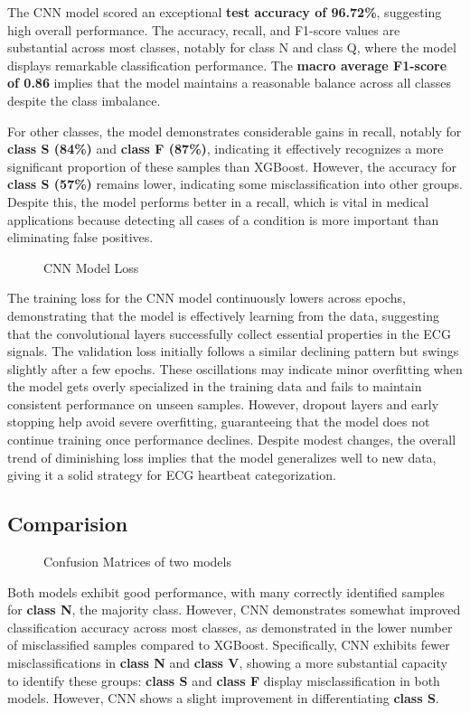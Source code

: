 \indent \indent The CNN model scored an exceptional \textbf{test accuracy of 96.72\%}, suggesting high overall performance. The accuracy, recall, and F1-score values are substantial across most classes, notably for class N and class Q, where the model displays remarkable classification performance. The \textbf{macro average F1-score of 0.86} implies that the model maintains a reasonable balance across all classes despite the class imbalance.

\indent For other classes, the model demonstrates considerable gains in recall, notably for \textbf{class S (84\%)} and \textbf{class F (87\%)}, indicating it effectively recognizes a more significant proportion of these samples than XGBoost. However, the accuracy for \textbf{class S (57\%)} remains lower, indicating some misclassification into other groups. Despite this, the model performs better in a recall, which is vital in medical applications because detecting all cases of a condition is more important than eliminating false positives.

\begin{figure}[H]
    \centering
        
    \caption{CNN Model Loss}
    \label{fig:CNNLoss}
\end{figure}

\indent The training loss for the CNN model continuously lowers across epochs, demonstrating that the model is effectively learning from the data, suggesting that the convolutional layers successfully collect essential properties in the ECG signals.  The validation loss initially follows a similar declining pattern but swings slightly after a few epochs.  These oscillations may indicate minor overfitting when the model gets overly specialized in the training data and fails to maintain consistent performance on unseen samples.  However, dropout layers and early stopping help avoid severe overfitting, guaranteeing that the model does not continue training once performance declines.  Despite modest changes, the overall trend of diminishing loss implies that the model generalizes well to new data, giving it a solid strategy for ECG heartbeat categorization.

\subsection{Comparision}
\begin{figure}[H]
    \centering
        
    \caption{Confusion Matrices of two models}
    \label{fig:ConfustionMatrices}
\end{figure}

\indent \indent Both models exhibit good performance, with many correctly identified samples for \textbf{class N}, the majority class. However, CNN demonstrates somewhat improved classification accuracy across most classes, as demonstrated in the lower number of misclassified samples compared to XGBoost. Specifically, CNN exhibits fewer misclassifications in \textbf{class N} and \textbf{class V}, showing a more substantial capacity to identify these groups: \textbf{class S} and \textbf{class F} display misclassification in both models. However, CNN shows a slight improvement in differentiating \textbf{class S}.
